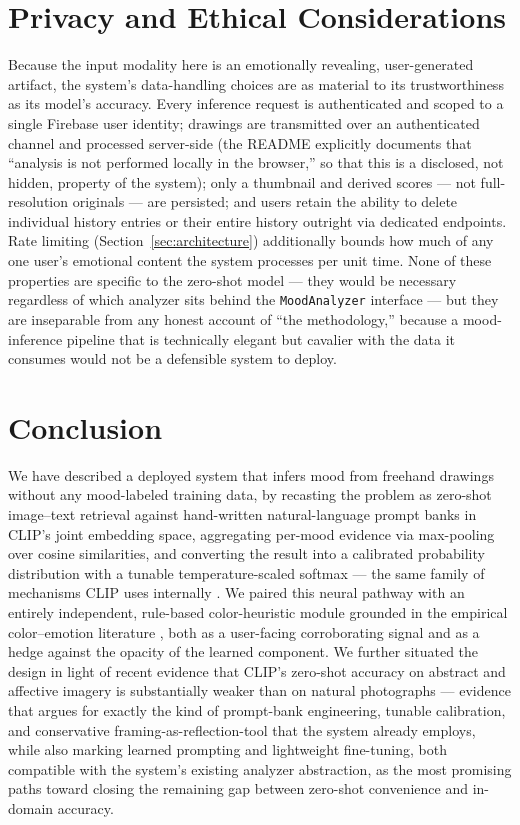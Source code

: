 \documentclass[10pt,twocolumn,letterpaper]{article}
\begin{document}
\section{Privacy and Ethical Considerations}

Because the input modality here is an emotionally revealing, user-generated artifact, the system's data-handling choices are as material to its trustworthiness as its model's accuracy. Every inference request is authenticated and scoped to a single Firebase user identity; drawings are transmitted over an authenticated channel and processed server-side (the README explicitly documents that ``analysis is not performed locally in the browser,'' so that this is a disclosed, not hidden, property of the system); only a thumbnail and derived scores --- not full-resolution originals --- are persisted; and users retain the ability to delete individual history entries or their entire history outright via dedicated endpoints. Rate limiting (Section~\ref{sec:architecture}) additionally bounds how much of any one user's emotional content the system processes per unit time. None of these properties are specific to the zero-shot model --- they would be necessary regardless of which analyzer sits behind the \texttt{MoodAnalyzer} interface --- but they are inseparable from any honest account of ``the methodology,'' because a mood-inference pipeline that is technically elegant but cavalier with the data it consumes would not be a defensible system to deploy.

\section{Conclusion}

We have described a deployed system that infers mood from freehand drawings without any mood-labeled training data, by recasting the problem as zero-shot image--text retrieval against hand-written natural-language prompt banks in CLIP's joint embedding space, aggregating per-mood evidence via max-pooling over cosine similarities, and converting the result into a calibrated probability distribution with a tunable temperature-scaled softmax --- the same family of mechanisms CLIP uses internally \cite{radford2021clip,guo2017calibration}. We paired this neural pathway with an entirely independent, rule-based color-heuristic module grounded in the empirical color--emotion literature \cite{wilms2018color,colornature2024}, both as a user-facing corroborating signal and as a hedge against the opacity of the learned component. We further situated the design in light of recent evidence that CLIP's zero-shot accuracy on abstract and affective imagery is substantially weaker than on natural photographs \cite{conde2024affectiveart} --- evidence that argues for exactly the kind of prompt-bank engineering, tunable calibration, and conservative framing-as-reflection-tool that the system already employs, while also marking learned prompting and lightweight fine-tuning, both compatible with the system's existing analyzer abstraction, as the most promising paths toward closing the remaining gap between zero-shot convenience and in-domain accuracy.
\end{document}
